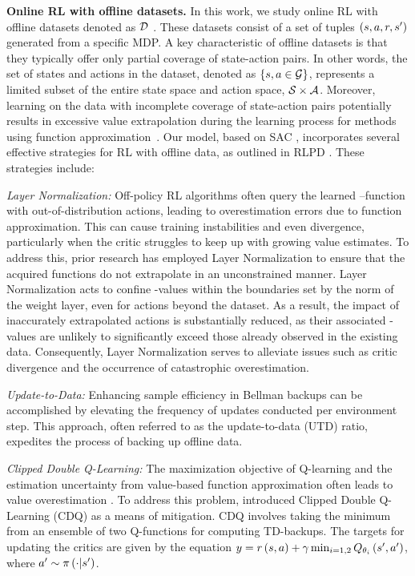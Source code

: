 \textbf{Online RL with offline datasets.}
In this work, we study online RL with offline datasets denoted as $\mathcal{D}$ \citep{ball2023efficient}. These datasets consist of a set of tuples $(s, a, r, s')$ generated from a specific MDP. 
A key characteristic of offline datasets is that they typically offer only partial coverage of state-action pairs. In other words, the set of states and actions in the dataset, denoted as $\left\{s,a\in \mathcal{G}\right\}$, represents a limited subset of the entire state space and action space, $\mathcal{S} \times \mathcal{A}$. 
Moreover, learning on the  data with incomplete coverage of state-action pairs potentially results in excessive value extrapolation during the learning process for methods using function approximation~\citep{fujimoto2019off}.
Our model, based on SAC \citep{haarnoja2018soft}, incorporates several effective strategies for RL with offline data, as outlined in RLPD \citep{ball2023efficient}. These strategies include:




\emph{Layer Normalization:} %
Off-policy RL algorithms often query the learned \QFunc--function with out-of-distribution actions, leading to overestimation errors due to function approximation. This can cause training instabilities and even divergence, particularly when the critic struggles to keep up with growing value estimates. To address this, prior research has employed Layer Normalization to ensure that the acquired functions do not extrapolate in an unconstrained manner. Layer Normalization acts to confine \QFunc-values within the boundaries set by the norm of the weight layer, even for actions beyond the dataset. As a result, the impact of inaccurately extrapolated actions is substantially reduced, as their associated \QFunc-values are unlikely to significantly exceed those already observed in the existing data. Consequently, Layer Normalization serves to alleviate issues such as critic divergence and the occurrence of catastrophic overestimation.

\emph{Update-to-Data:} Enhancing sample efficiency in Bellman backups can be accomplished by elevating the frequency of updates conducted per environment step. This approach, often referred to as the update-to-data (UTD) ratio, expedites the process of backing up offline data.


\emph{Clipped Double Q-Learning:} 
The maximization objective of Q-learning and the estimation uncertainty from value-based function approximation often  leads to value overestimation \citep{van2016deep}. To address this problem, \citet{fujimoto2018addressing} introduced Clipped Double Q-Learning (CDQ) as a means of mitigation. CDQ involves taking the minimum from an ensemble of two Q-functions for computing TD-backups. The targets for updating the critics are given by the equation $y=r \left( {s,a} \right)  + \gamma \min_{i=1,2} Q_{\theta_i} \left( {s',a'} \right) $, where $a'\sim \pi \left( {\cdot|s'} \right) $. 


